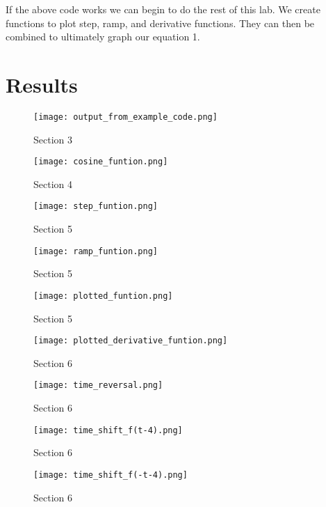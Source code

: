 \documentclass[12pt]{article}
\begin{document}
If the above code works we can begin to do the rest of this lab. We create functions to plot step, ramp, and derivative functions. They can then be combined to ultimately graph our equation 1.

\section*{Results}


\begin{figure}[H]
\caption{Section 3}
\centering
\texttt{[image: output\_from\_example\_code.png]}
\end{figure}

\begin{figure}[H]
\caption{Section 4}
\centering
\texttt{[image: cosine\_funtion.png]}
\end{figure}

\begin{figure}[H]
\caption{Section 5}
\centering
\texttt{[image: step\_funtion.png]}
\end{figure}


\begin{figure}[H]
\caption{Section 5}
\centering
\texttt{[image: ramp\_funtion.png]}
\end{figure}

\begin{figure}[H]
\caption{Section 5}
\centering
\texttt{[image: plotted\_funtion.png]}
\end{figure}


\begin{figure}[H]
\caption{Section 6}
\centering
\texttt{[image: plotted\_derivative\_funtion.png]}
\end{figure}

\begin{figure}[H]
\caption{Section 6}
\centering
\texttt{[image: time\_reversal.png]}
\end{figure}

\begin{figure}[H]
\caption{Section 6}
\centering
\texttt{[image: time\_shift\_f(t-4).png]}
\end{figure}

\begin{figure}[H]
\caption{Section 6}
\centering
\texttt{[image: time\_shift\_f(-t-4).png]}
\end{figure}
\end{document}
